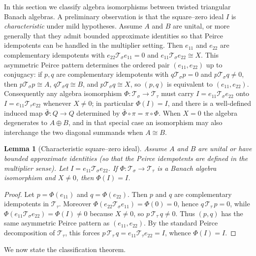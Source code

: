 \documentclass{article}
\theoremstyle{plain}
\newtheorem{lemma}[theorem]{Lemma}
\theoremstyle{definition}
\newcommand{\T}{\mathcal{T}}
\begin{document}
In this section we classify algebra isomorphisms between twisted triangular Banach algebras.
A preliminary observation is that the square--zero ideal \(I\) is \emph{characteristic} under mild hypotheses.
Assume \(A\) and \(B\) are unital, or more generally that they admit bounded approximate identities so that Peirce idempotents can be handled in the multiplier setting.
Then \(e_{11}\) and \(e_{22}\) are complementary idempotents with \(e_{22}\T_\sigma e_{11}=0\) and \(e_{11}\T_\sigma e_{22}\cong X\).
This asymmetric Peirce pattern determines the ordered pair \((e_{11},e_{22})\) up to conjugacy: if \(p,q\) are complementary idempotents with \(q\T_\sigma p=0\) and \(p\T_\sigma q\neq 0\), then \(p\T_\sigma p\cong A\), \(q\T_\sigma q\cong B\), and \(p\T_\sigma q\cong X\), so \((p,q)\) is equivalent to \((e_{11},e_{22})\).
Consequently any algebra isomorphism \(\Phi:\T_\sigma\to \T_\tau\) must carry \(I=e_{11}\T_\sigma e_{22}\) onto \(I=e_{11}\T_\tau e_{22}\) whenever \(X\neq 0\); in particular \(\Phi(I)=I\), and there is a well-defined induced map \(\bar\Phi:Q\to Q\) determined by \(\bar\Phi\circ\pi=\pi\circ\Phi\).
When \(X=0\) the algebra degenerates to \(A\oplus B\), and in that special case an isomorphism may also interchange the two diagonal summands when \(A\cong B\).
\begin{lemma}[Characteristic square--zero ideal]\label{lem:characteristic-I}
Assume $A$ and $B$ are unital or have bounded approximate identities (so that the Peirce
idempotents are defined in the multiplier sense). Let $I=e_{11}\T_\sigma e_{22}$.
If $\Phi:\T_\sigma\to \T_\tau$ is a Banach algebra isomorphism and $X\neq 0$, then $\Phi(I)=I$.
\end{lemma}

\begin{proof}
Let $p=\Phi(e_{11})$ and $q=\Phi(e_{22})$. Then $p$ and $q$ are complementary idempotents in $\T_\tau$.
Moreover $\Phi(e_{22}\T_\sigma e_{11})=\Phi(0)=0$, hence $q\,\T_\tau\,p=0$, while
$\Phi(e_{11}\T_\sigma e_{22})=\Phi(I)\neq 0$ because $X\neq 0$, so $p\,\T_\tau\,q\neq 0$.
Thus $(p,q)$ has the same asymmetric Peirce pattern as $(e_{11},e_{22})$.
By the standard Peirce decomposition of $\T_\tau$, this forces $p\,\T_\tau\,q=e_{11}\T_\tau e_{22}=I$,
whence $\Phi(I)=I$.
\end{proof}

We now state the classification theorem.
\end{document}

